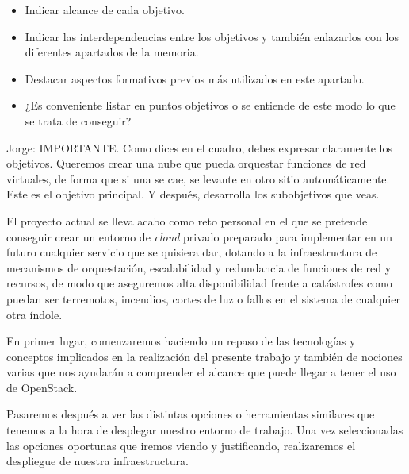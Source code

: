 \begin{tcolorbox}[colback=red!5!white,colframe=red!75!black]
% 
% 
\begin{itemize}
\item Indicar alcance de cada objetivo.
\item Indicar las interdependencias entre los objetivos y también enlazarlos con los diferentes apartados de la memoria.
\item Destacar aspectos formativos previos más utilizados en este apartado.
\item ¿Es conveniente listar en puntos objetivos o se entiende de este modo lo que se trata de conseguir?
\end{itemize}

\end{tcolorbox}

\begin{tcolorbox}[colback=orange!5!white,colframe=orange!75!black]
Jorge: IMPORTANTE. Como dices en el cuadro, debes expresar claramente los objetivos. Queremos crear una nube que pueda orquestar funciones de red virtuales, de forma que si una se cae, se levante en otro sitio automáticamente. Este es el objetivo principal. Y después, desarrolla los subobjetivos que veas.
\end{tcolorbox}

El proyecto actual se lleva acabo como reto personal en el que se pretende conseguir crear un entorno de \textit{cloud} privado preparado para implementar en un futuro cualquier servicio que se quisiera dar, dotando a la infraestructura de mecanismos de orquestación, escalabilidad y redundancia de funciones de red y recursos, de modo que aseguremos alta disponibilidad frente a catástrofes como puedan ser terremotos, incendios, cortes de luz o fallos en el sistema de cualquier otra índole.

En primer lugar, comenzaremos haciendo un repaso de las tecnologías y conceptos implicados en la realización del presente trabajo y también de nociones varias que nos ayudarán a comprender el alcance que puede llegar a tener el uso de OpenStack.

Pasaremos después a ver las distintas opciones o herramientas similares que tenemos a la hora de desplegar nuestro entorno de trabajo. Una vez seleccionadas las opciones oportunas que iremos viendo y justificando, realizaremos el despliegue de nuestra infraestructura.

